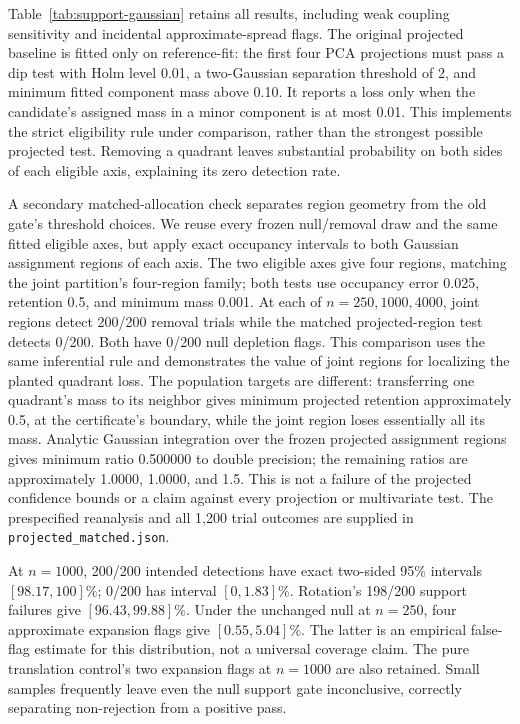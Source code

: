 Table~\ref{tab:support-gaussian} retains all results, including weak coupling
sensitivity and incidental approximate-spread flags. The original projected
baseline is fitted only on reference-fit: the first four PCA projections must
pass a dip test with Holm level 0.01, a two-Gaussian separation threshold of 2,
and minimum fitted component mass above 0.10. It reports a loss only when the
candidate's assigned mass in a minor component is at most 0.01. This implements
the strict eligibility rule under comparison, rather than the strongest
possible projected test. Removing a quadrant leaves substantial probability
on both sides of each eligible axis, explaining its zero detection rate.

A secondary matched-allocation check separates region geometry from the old
gate's threshold choices. We reuse every frozen null/removal draw and the same
fitted eligible axes, but apply exact occupancy intervals to both Gaussian
assignment regions of each axis. The two eligible axes give four regions,
matching the joint partition's four-region family; both tests use occupancy
error 0.025, retention 0.5, and minimum mass 0.001. At each of
$n=250,1000,4000$, joint regions detect 200/200 removal trials while the matched
projected-region test detects 0/200. Both have 0/200 null depletion flags.
This comparison uses the same inferential rule and demonstrates the value of
joint regions for localizing the planted quadrant loss. The population targets
are different: transferring one quadrant's mass to its neighbor gives minimum
projected retention approximately 0.5, at the certificate's boundary, while the
joint region loses essentially all its mass. Analytic Gaussian integration over
the frozen projected assignment regions gives minimum ratio 0.500000 to double
precision; the remaining ratios are approximately 1.0000, 1.0000, and 1.5.
This is not a failure of the projected confidence bounds or a claim against
every projection or multivariate test. The prespecified reanalysis and
all 1,200 trial outcomes are supplied in \texttt{projected\_matched.json}.

At $n=1000$, 200/200 intended detections have exact two-sided 95\% intervals
$[98.17,100]\%$; 0/200 has interval $[0,1.83]\%$. Rotation's 198/200 support
failures give $[96.43,99.88]\%$. Under the unchanged null at $n=250$, four
approximate expansion flags give $[0.55,5.04]\%$. The latter is an empirical
false-flag estimate for this distribution, not a universal coverage claim.
The pure translation control's two expansion flags at $n=1000$ are also
retained. Small samples frequently leave even the null support gate
inconclusive, correctly separating non-rejection from a positive pass.

